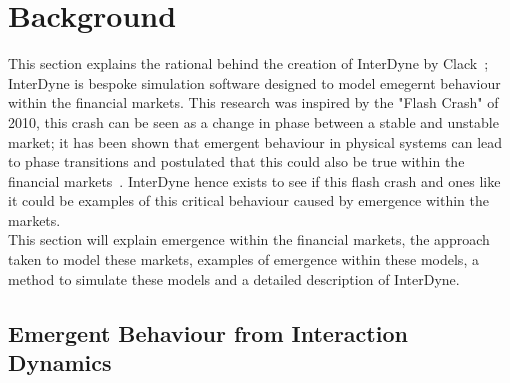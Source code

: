 \documentclass{article}
\begin{document}






\section{Background} 

This section explains the rational behind the creation of InterDyne by Clack~\cite{Chris_webPage}; InterDyne is bespoke simulation software designed to model emegernt behaviour within the financial markets. This research was inspired by the "Flash Crash" of 2010, this crash can be seen as a change in phase between a stable and unstable market; it has been shown that emergent behaviour in physical systems can lead to phase transitions and postulated that this could also be true within the financial markets~\cite{networkcastphorynature}. InterDyne hence exists to see if this flash crash and ones like it could be examples of this critical behaviour caused by emergence within the markets.\\     
This section will explain emergence within the financial markets, the approach taken to model these markets, examples of emergence within these models, a method to simulate these models and a detailed description of InterDyne.         


\subsection{Emergent Behaviour from Interaction Dynamics} 
\end{document}
